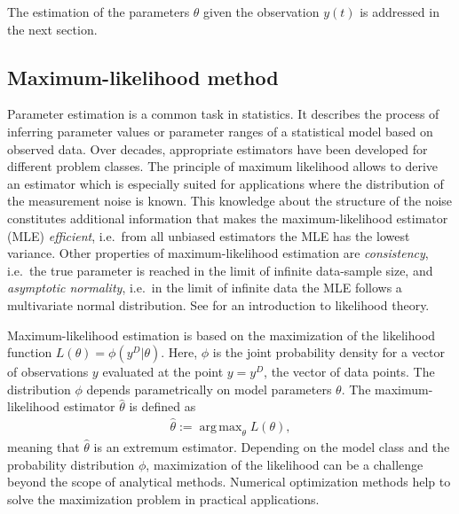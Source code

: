 \documentclass[article]{jss}
\DeclareMathOperator*{\argmax}{arg\,max}
\begin{document}
The estimation of the parameters $\theta$ given the observation $y(t)$ is addressed in the next section.



\subsection{Maximum-likelihood method}

Parameter estimation is a common task in statistics. It describes the process of inferring parameter values or parameter ranges of a statistical model based on observed data. Over decades, appropriate estimators have been developed for different problem classes. The principle of maximum likelihood allows to derive an estimator which is especially suited for applications where the distribution of the measurement noise is known. This knowledge about the structure of the noise constitutes additional information that makes the maximum-likelihood estimator (MLE) \textit{efficient}, i.e.~from all unbiased estimators the MLE has the lowest variance. Other properties of maximum-likelihood estimation are \textit{consistency}, i.e.~the true parameter is reached in the limit of infinite data-sample size, and \textit{asymptotic normality}, i.e.~in the limit of infinite data the MLE follows a multivariate normal distribution. See \citep{azzalini1996statistical} for an introduction to likelihood theory.

Maximum-likelihood estimation is based on the maximization of the likelihood function $L(\theta) = \phi(y^D|\theta)$. Here, $\phi$ is the joint probability density for a vector of observations $y$ evaluated at the point $y = y^D$, the vector of data points. The distribution $\phi$ depends parametrically on model parameters $\theta$. The maximum-likelihood estimator $\hat\theta$ is defined as
\begin{align*}
	\hat \theta := \argmax_{\theta} L(\theta),
\end{align*}
meaning that $\hat\theta$ is an extremum estimator. Depending on the model class and the probability distribution $\phi$, maximization of the likelihood can be a challenge beyond the scope of analytical methods. Numerical optimization methods help to solve the maximization problem in practical applications.
\end{document}
